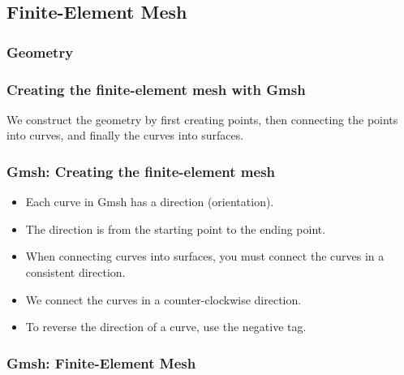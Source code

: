 \documentclass[aspectratio=169]{beamer}
\begin{document}
\subsection{Finite-Element Mesh}

\begin{frame}
  \frametitle{Geometry}
  \summary{}

  
\end{frame}


\begin{frame}
  \frametitle{Creating the finite-element mesh with Gmsh}
  \summary{}

  We construct the geometry by first creating points, then connecting the points into curves, and finally the curves into surfaces.
  
  
\end{frame}


\begin{frame}
  \frametitle{Gmsh: Creating the finite-element mesh}
  \summary{}
  
  \begin{itemize}
  \item Each curve in Gmsh has a direction (orientation).
  \item The direction is from the starting point to the ending point.
  \item When connecting curves into surfaces, you must connect the curves in a consistent direction.
  \item We connect the curves in a counter-clockwise direction.
  \item To reverse the direction of a curve, use the negative tag.
  \end{itemize}
  
\end{frame}

\begin{frame}
  \frametitle{Gmsh: Finite-Element Mesh}

  
\end{frame}
\end{document}
